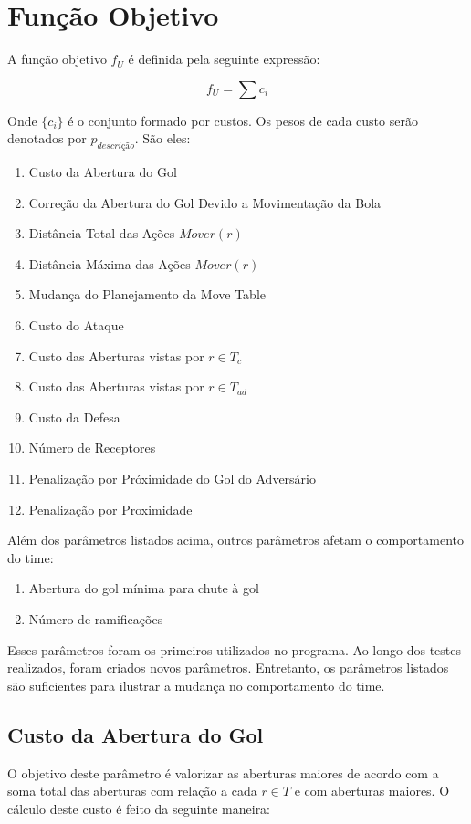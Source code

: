\section{Função Objetivo}
A função objetivo $f_U$ é definida pela seguinte
expressão:

\begin{dmath}
  f_U = \sum c_i 
\end{dmath}

Onde $\lbrace c_i \rbrace$ é o conjunto formado por custos. Os pesos de
cada custo serão denotados por $p_{descrição}$. São eles:
\begin{enumerate}
  \item Custo da Abertura do Gol
  \item Correção da Abertura do Gol Devido a Movimentação da Bola
  \item Distância Total das Ações $Mover(r)$
  \item Distância Máxima das Ações $Mover(r)$
  \item Mudança do Planejamento da Move Table
  \item Custo do Ataque
  \item Custo das Aberturas vistas por $r \in T_c$
  \item Custo das Aberturas vistas por $r \in T_{ad}$
  \item Custo da Defesa
  \item Número de Receptores
  \item Penalização por Próximidade do Gol do Adversário
  \item Penalização por Proximidade
\end{enumerate}

Além dos parâmetros listados acima, outros parâmetros
afetam o comportamento do time:
\begin{enumerate}
  \item Abertura do gol mínima para chute à gol
  \item Número de ramificações
\end{enumerate}

Esses parâmetros foram os primeiros utilizados no programa.
Ao longo dos testes realizados, foram criados novos parâmetros.
Entretanto, os parâmetros listados são suficientes para ilustrar
a mudança no comportamento do time.

\subsection{Custo da Abertura do Gol}\label{subsec:custo_gap}
O objetivo deste parâmetro é valorizar as aberturas maiores
de acordo com a soma total das aberturas com relação a cada
$r \in T$ e com aberturas maiores.
O cálculo deste custo é feito da seguinte maneira:

